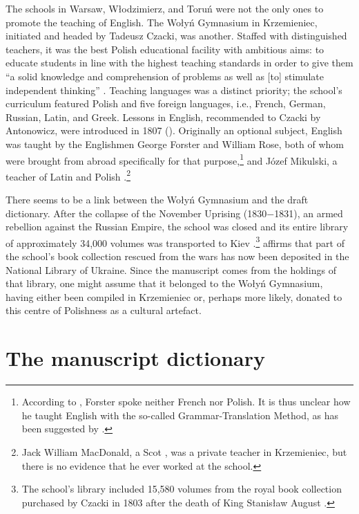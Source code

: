 \documentclass[output=paper,colorlinks,citecolor=brown,arabicfont,chinesefont]{langscibook}
\begin{document}
The schools in Warsaw, Włodzimierz, and Toruń were not the only ones to promote the teaching of English. The Wołyń Gymnasium in Krzemieniec, initiated and headed by Tadeusz Czacki, was another. Staffed with distinguished teachers, it was the best Polish educational facility with ambitious aims: to educate students in line with the highest teaching standards in order to give them “a solid knowledge and comprehension of problems as well as [to] stimulate independent thinking” \citep[3]{Buczek2016a}. Teaching languages was a distinct priority; the school’s curriculum featured Polish and five foreign languages, i.e., French, German, Russian, Latin, and Greek. Lessons in English, recommended to Czacki by Antonowicz, were introduced in 1807 (\cites[125]{Ciesla_michal1974}[154]{Buczek2016b}). Originally an optional subject, English was taught by the Englishmen George Forster and William Rose, both of whom were brought from abroad specifically for that purpose,\footnote{According to \citet[154]{Buczek2016b}, Forster spoke neither French nor Polish. It is thus unclear how he taught English with the so-called Grammar-Translation Method, as has been suggested by \citet[214]{Piotrowski_wojciech2005}.} and Józef Mikulski, a teacher of Latin and Polish \citep[344]{Slowikowski1863}.\footnote{Jack William MacDonald, a Scot \citep[38]{Nicoll_josephine1923}, was a private teacher in Krzemieniec, but there is no evidence that he ever worked at the school.}

There seems to be a link between the Wołyń Gymnasium and the draft dictionary. After the collapse of the November Uprising (1830−1831), an armed rebellion against the Russian Empire, the school was closed and its entire library of approximately 34,000 volumes was transported to Kiev \citep[82]{Danilewicz-zielinska_maria1992}.\footnote{The school’s library included 15,580 volumes from the royal book collection purchased by Czacki in 1803 after the death of King Stanisław August \citep[8--9]{Buczek2016a}.}  \citet[18]{Buczek2016b} affirms that part of the school’s book collection rescued from the wars has now been deposited in the National Library of Ukraine. Since the manuscript comes from the holdings of that library, one might assume that it belonged to the Wołyń Gymnasium, having either been compiled in Krzemieniec or, perhaps more likely, donated to this centre of Polishness as a cultural artefact.

\section{The manuscript dictionary}
\end{document}

